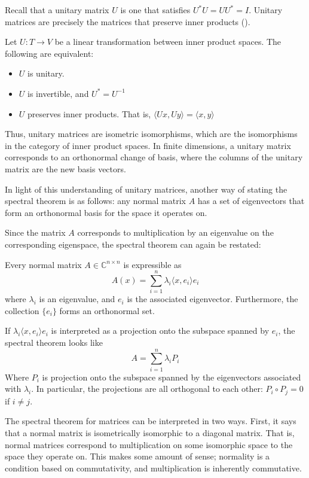 Recall that a unitary matrix $U$ is one that satisfies $U^*U = UU^* = I$.
Unitary matrices are precisely the matrices that preserve inner
products (\cite[p. 39-40]{MacCluer2009}).
\begin{theorem}
    Let $U:T\to V$ be a linear transformation between inner product spaces. The
    following are equivalent:
    \begin{itemize}
        \itemsep0em
        \item $U$ is unitary.
        \item $U$ is invertible, and $U^* = U^{-1}$
        \item $U$ preserves inner products. That is, $\langle Ux, Uy\rangle =
            \langle x,y \rangle$
    \end{itemize}
\end{theorem}
Thus, unitary matrices are isometric isomorphisms, which are the isomorphisms in
the category of inner product spaces. In finite dimensions, a unitary matrix
corresponds to an orthonormal change of basis, where the columns of the unitary
matrix are the new basis vectors.

In light of this understanding of unitary matrices, another way of stating the
spectral theorem is as follows: any normal matrix $A$ has a set of eigenvectors
that form an orthonormal basis for the space it operates on.

Since the matrix $A$ corresponds to multiplication by an eigenvalue on the
corresponding eigenspace, the spectral theorem can again be restated:
\begin{theorem}
    Every normal matrix $A\in\mathbb{C}^{n\times n}$ is expressible as
    \[
        A(x) = \sum_{i=1}^n \lambda_i \langle x,e_i\rangle e_i
        \]
    where $\lambda_i$ is an eigenvalue, and $e_i$ is the associated
    eigenvector. Furthermore, the collection $\{e_i\}$ forms an orthonormal set.
\end{theorem}

If $\lambda_i \langle x,e_i\rangle e_i$ is interpreted as a projection onto the
subspace spanned by $e_i$, the spectral theorem looks like
\[
    A = \sum_{i=1}^n \lambda_i P_i
    \]
Where $P_i$ is projection onto the subspace spanned by the eigenvectors
associated with $\lambda_i$. In particular, the projections are all orthogonal
to each other: $P_i\circ P_j = 0$ if $i\not = j$.

The spectral theorem for matrices can be interpreted in two ways. First, it says
that a normal matrix is isometrically isomorphic to a diagonal matrix. That is,
normal matrices correspond to multiplication on some isomorphic space to the
space they operate on. This makes some amount of sense; normality is a condition
based on commutativity, and multiplication is inherently commutative.

